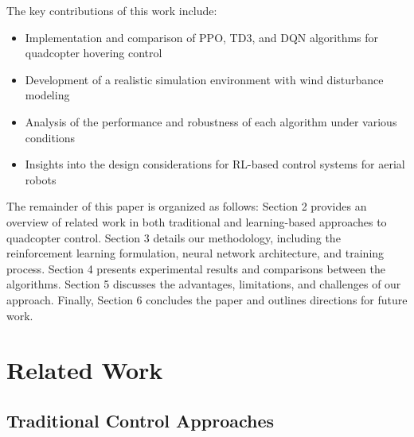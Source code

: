 \documentclass[12pt]{article}
\begin{document}
The key contributions of this work include:
\begin{itemize}
    \item Implementation and comparison of PPO, TD3, and DQN algorithms for quadcopter hovering control
    \item Development of a realistic simulation environment with wind disturbance modeling
    \item Analysis of the performance and robustness of each algorithm under various conditions
    \item Insights into the design considerations for RL-based control systems for aerial robots
\end{itemize}


The remainder of this paper is organized as follows: Section 2 provides an overview of related work in both traditional and learning-based approaches to quadcopter control. Section 3 details our methodology, including the reinforcement learning formulation, neural network architecture, and training process. Section 4 presents experimental results and comparisons between the algorithms. Section 5 discusses the advantages, limitations, and challenges of our approach. Finally, Section 6 concludes the paper and outlines directions for future work.


\section{Related Work}
\subsection{Traditional Control Approaches}
\end{document}
